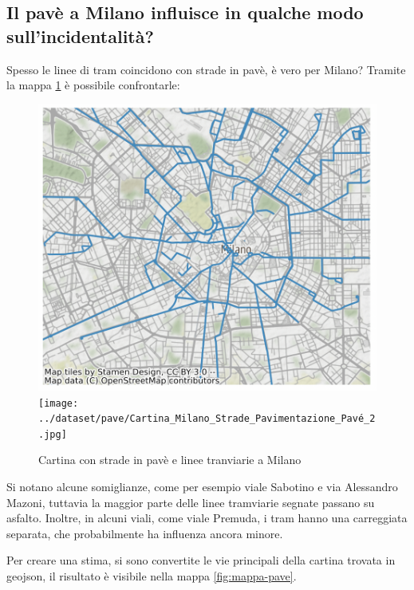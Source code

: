 \documentclass[a4paper]{report}
\begin{document}

\subsection{Il pavè a Milano influisce in qualche modo sull'incidentalità?}

Spesso le linee di tram coincidono con strade in pavè, è vero per Milano? 
Tramite la mappa \ref{fig:tram-pave-milano} è possibile confrontarle: 

\begin{figure}
    \includegraphics[width=0.48\linewidth]{../src/tram/tram.png}
    \texttt{[image: ../dataset/pave/Cartina\_Milano\_Strade\_Pavimentazione\_Pavé\_2.jpg]}
    \caption{Cartina con strade in pavè e linee tranviarie a Milano}
    \label{fig:tram-pave-milano}
\end{figure}

Si notano alcune somiglianze, come per esempio viale Sabotino e via Alessandro Mazoni, 
tuttavia la maggior parte delle linee tramviarie segnate passano su asfalto.
Inoltre, in alcuni viali, come viale Premuda, i tram hanno una carreggiata separata, 
che probabilmente ha influenza ancora minore.

Per creare una stima, si sono convertite le vie principali della cartina trovata 
in geojson, il risultato è visibile nella mappa \ref{fig:mappa-pave}.
\end{document}
